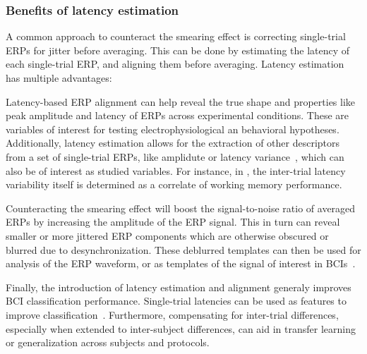 
\subsubsection{Benefits of latency estimation}
A common approach to counteract the smearing effect is correcting single-trial
ERPs for jitter before averaging. This can be done by estimating the latency of each
single-trial ERP, and aligning them before averaging.
Latency estimation has multiple advantages:
\begin{enumerate*}[label={(\arabic*)}]
	\item Latency-based ERP alignment can help reveal the true shape and
	properties like peak amplitude and latency of ERPs across
	experimental conditions. These are variables of interest for
	testing electrophysiological an behavioral hypotheses.
	Additionally, latency estimation allows for the extraction of
	other descriptors from a set of single-trial ERPs, like
	amplidute or latency variance~\cite{Hultsch2004}, which can
	also be of interest as studied variables. For instance, in
	\cite{Saville2014}, the inter-trial latency variability itself
	is determined as a correlate of working memory performance.
	\item Counteracting the smearing effect will boost the signal-to-noise
	ratio of averaged ERPs by increasing the amplitude of the
	ERP signal. This in turn can reveal smaller or more jittered ERP components
	which are otherwise obscured or blurred due to desynchronization.
	These deblurred templates can then be used for analysis of the ERP
	waveform, or as templates of the signal of interest in
	BCIs~\cite{arico2014influence}.
	\item Finally, the introduction of latency estimation and alignment generaly
	improves BCI classification performance. Single-trial latencies can be
	used as features to improve classification~\cite{hardiansyah2020single}.
	Furthermore, compensating for inter-trial differences, especially when
	extended to inter-subject differences, can aid in transfer learning or
	generalization across subjects and protocols\cite{Iturrate2014}.
\end{enumerate*}

